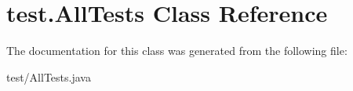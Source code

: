 \hypertarget{classtest_1_1AllTests}{\section{test.\-All\-Tests Class Reference}
\label{classtest_1_1AllTests}
}


The documentation for this class was generated from the following file\-:\begin{DoxyCompactItemize}
\item 
test/All\-Tests.\-java\end{DoxyCompactItemize}
